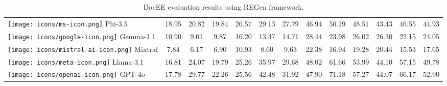 \begin{table*}[h!]
\begin{tabular}{l|ccc|ccc|ccc|ccc}
\texttt{[image: icons/ms-icon.png]} Phi-3.5 & 18.95 & 20.82 & 19.84 & 26.57 & 29.13 & 27.79 & 46.94 & 50.19 & 48.51 & 43.43 & 46.55 & 44.93 \\
\texttt{[image: icons/google-icon.png]} Gemma-1.1 & 10.90 & 9.01 & 9.87 & 16.20 & 13.47 & 14.71 & 28.44 & 23.98 & 26.02 & 26.30 & 22.15 & 24.05 \\
\texttt{[image: icons/mistral-ai-icon.png]} Mixtral & 7.84 & 6.17 & 6.90 & 10.93 & 8.60 & 9.63 & 22.38 & 16.94 & 19.28 & 20.44 & 15.53 & 17.65 \\
\texttt{[image: icons/meta-icon.png]} Llama-3.1 & 16.81 & 24.07 & 19.79 & 25.26 & 35.97 & 29.68 & 48.02 & 61.66 & 53.99 & 44.10 & 57.15  & 49.78 \\
\texttt{[image: icons/openai-icon.png]} GPT-4o & 17.78 & 29.77 & 22.26 & 25.56 & 42.48 & 31.92 & 47.90 & 71.18 & 57.27 & 44.07 & 66.17 & 52.90\\

\bottomrule 
\end{tabular}
\caption{DocEE evaluation results using REGen framework.}
\label{DocEE-all-results}
\end{table*}

